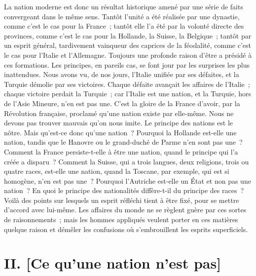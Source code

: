 \documentclass[french,twoside]{book} %
\newcommand\orgName[1]{#1}
\newcommand\placeName[1]{#1}
\newcommand\chapteropen{} %
\newcommand\chapterclose{} %
\begin{document}
La nation moderne est donc un résultat historique amené par une série de faits convergeant dans le même sens. Tantôt l’unité a été réalisée par une dynastie, comme c’est le cas pour la {\placeName France} ; tantôt elle l’a été par la volonté directe des provinces, comme c’est le cas pour la {\placeName Hollande}, la {\placeName Suisse}, la {\placeName Belgique} ; tantôt par un esprit général, tardivement vainqueur des caprices de la féodalité, comme c’est le cas pour l’{\placeName Italie} et l’{\placeName Allemagne}. Toujours une profonde raison d’être a présidé à ces formations. Les principes, en pareils cas, se font jour par les surprises les plus inattendues. Nous avons vu, de nos jours, l’{\orgName Italie} unifiée par ses défaites, et la {\orgName Turquie} démolie par ses victoires. Chaque défaite avançait les affaires de l’{\orgName Italie} ; chaque victoire perdait la {\orgName Turquie} ; car l’{\orgName Italie} est une nation, et la {\orgName Turquie}, hors de l’{\placeName Asie Mineure}, n’en est pas une. C’est la gloire de la {\orgName France} d’avoir, par la Révolution française, proclamé qu’une nation existe par elle-même. Nous ne devons pas trouver mauvais qu’on nous imite. Le principe des nations est le nôtre. Mais qu’est-ce donc qu’une nation ? Pourquoi la {\placeName Hollande} est-elle une nation, tandis que le {\placeName Hanovre} ou le {\placeName grand-duché de Parme} n’en sont pas une ? Comment la {\placeName France} persiste-t-elle à être une nation, quand le principe qui l’a créée a disparu ? Comment la {\placeName Suisse}, qui a trois langues, deux religions, trois ou quatre races, est-elle une nation, quand la {\placeName Toscane}, par exemple, qui est si homogène, n’en est pas une ? Pourquoi l’{\placeName Autriche} est-elle un État et non pas une nation ? En quoi le principe des nationalités diffère-t-il du principe des races ? Voilà des points sur lesquels un esprit réfléchi tient à être fixé, pour se mettre d’accord avec lui-même. Les affaires du monde ne se règlent guère par ces sortes de raisonnements ; mais les hommes appliqués veulent porter en ces matières quelque raison et démêler les confusions où s’embrouillent les esprits superficiels.
\chapterclose


\chapteropen

\chapter[{II. [Ce qu’une nation n’est pas]}]{II. [Ce qu’une nation n’est pas]}
\renewcommand{\leftmark}{II. [Ce qu’une nation n’est pas]}
\end{document}
